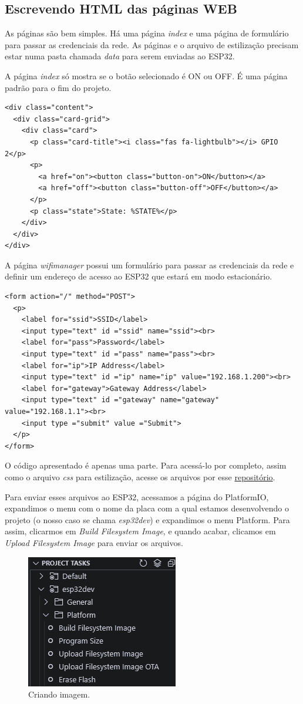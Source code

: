 \subsection{Escrevendo HTML das páginas WEB}

As páginas são bem simples. Há uma página \textit{index} e uma página de formulário para passar as credenciais da rede. As páginas e o arquivo de estilização precisam estar numa pasta chamada \textit{data} para serem enviadas ao ESP32.

A página \textit{index} só mostra se o botão selecionado é ON ou OFF. É uma página padrão para o fim do projeto.

\begin{lstlisting}
<div class="content">
  <div class="card-grid">
    <div class="card">
      <p class="card-title"><i class="fas fa-lightbulb"></i> GPIO 2</p>
      <p>
        <a href="on"><button class="button-on">ON</button></a>
        <a href="off"><button class="button-off">OFF</button></a>
      </p>
      <p class="state">State: %STATE%</p>
    </div>
  </div>
</div>
\end{lstlisting}

A página \textit{wifimanager} possui um formulário para passar as credenciais da rede e definir um endereço de acesso ao ESP32 que estará em modo estacionário.

\begin{lstlisting}
<form action="/" method="POST">
  <p>
    <label for="ssid">SSID</label>
    <input type="text" id ="ssid" name="ssid"><br>
    <label for="pass">Password</label>
    <input type="text" id ="pass" name="pass"><br>
    <label for="ip">IP Address</label>
    <input type="text" id ="ip" name="ip" value="192.168.1.200"><br>
    <label for="gateway">Gateway Address</label>
    <input type="text" id ="gateway" name="gateway" value="192.168.1.1"><br>
    <input type ="submit" value ="Submit">
  </p>
</form>
\end{lstlisting}

O código apresentado é apenas uma parte. Para acessá-lo por completo, assim como o arquivo \textit{css} para estilização, acesse os arquivos por esse \href{https://github.com/fabricio-araujo94/microcontroladores/tree/main/wifi_manager_/data}{repositório}.

Para enviar esses arquivos ao ESP32, acessamos a página do PlatformIO, expandimos o menu com o nome da placa com a qual estamos desenvolvendo o projeto (o nosso caso se chama \textit{esp32dev}) e expandimos o menu Platform. Para assim, clicarmos em \textit{Build Filesystem Image}, e quando acabar, clicamos em \textit{Upload Filesystem Image} para enviar os arquivos.

\begin{figure}[H]
    \centering
    \includegraphics[width=0.5\linewidth]{img/build_image.png}
    \caption{Criando imagem.}
    \label{fig:build-image}
\end{figure}